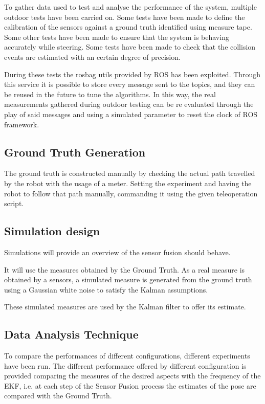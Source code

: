 To gather data used to test and analyse the performance of the system, multiple outdoor tests have been carried on.
Some tests have been made to define the calibration of the sensors against a ground truth identified using measure tape.
Some other tests have been made to ensure that the system is behaving accurately while steering.
Some tests have been made to check that the collision events are estimated with an certain degree of precision.

During these tests the rosbag utils provided by ROS has been exploited. Through this service it is possible to store every message sent to the topics, and they can be reused in the future to tune the algorithms.
In this way, the real measurements gathered during outdoor testing can be re evaluated through the play of said messages and using a simulated parameter to reset the clock of ROS framework.



\subsection{Ground Truth Generation}
\label{sec:gt}

\noindent The ground truth is constructed manually by checking the actual path travelled by the robot with the usage of a meter. Setting the experiment and having the robot to follow that path manually, commanding it using the given teleoperation script.


\subsection{Simulation design}
\label{sec:simDesign}

\noindent Simulations will provide an overview of the sensor fusion should behave.

It will use the measures obtained by the Ground Truth.
As a real measure is obtained by a sensors, a simulated measure is generated from the ground truth using a Gaussian white noise to satisfy the Kalman assumptions.

These simulated measures are used by the Kalman filter to offer its estimate.



\subsection{Data Analysis Technique}

\noindent To compare the performances of different configurations, different experiments have been run.
The different performance offered by different configuration is provided comparing the measures of the desired aspects with the frequency of the \gls{EKF}, i.e. at each step of the Sensor Fusion process the estimates of the pose are compared with the Ground Truth.



